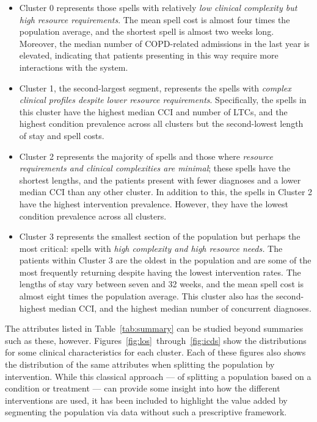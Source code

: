 \documentclass[]{interact}
\theoremstyle{plain}%
\theoremstyle{definition}
\theoremstyle{remark}
\begin{document}
\begin{itemize}
    \item Cluster 0 represents those spells with relatively {\slshape low
        clinical complexity but high resource requirements}. The mean spell cost
        is almost four times the population average, and the shortest spell is
        almost two weeks long. Moreover, the median number of COPD-related
        admissions in the last year is elevated, indicating that patients
        presenting in this way require more interactions with the system.
    \item Cluster 1, the second-largest segment, represents the spells with
        {\slshape complex clinical profiles despite lower resource
        requirements}. Specifically, the spells in this cluster have the highest
        median CCI and number of LTCs, and the highest condition prevalence
        across all clusters but the second-lowest length of stay and spell
        costs.
    \item Cluster 2 represents the majority of spells and those where {\slshape
        resource requirements and clinical complexities are minimal}; these
        spells have the shortest lengths, and the patients present with fewer
        diagnoses and a lower median CCI than any other cluster. In addition to
        this, the spells in Cluster 2 have the highest intervention prevalence.
        However, they have the lowest condition prevalence across all clusters.
    \item Cluster 3 represents the smallest section of the population but
        perhaps the most critical: spells with {\slshape high complexity and
        high resource needs.} The patients within Cluster 3 are the oldest in
        the population and are some of the most frequently returning despite
        having the lowest intervention rates. The lengths of stay vary between
        seven and 32 weeks, and the mean spell cost is almost eight times the
        population average. This cluster also has the second-highest median
        CCI, and the highest median number of concurrent diagnoses.
\end{itemize}

The attributes listed in Table~\ref{tab:summary} can be studied beyond summaries
such as these, however. Figures~\ref{fig:los}~through~\ref{fig:icds} show the
distributions for some clinical characteristics for each cluster. Each of these
figures also shows the distribution of the same attributes when splitting the
population by intervention. While this classical approach --- of splitting a
population based on a condition or treatment --- can provide some insight into
how the different interventions are used, it has been included to highlight the
value added by segmenting the population via data without such a prescriptive
framework.
\end{document}
